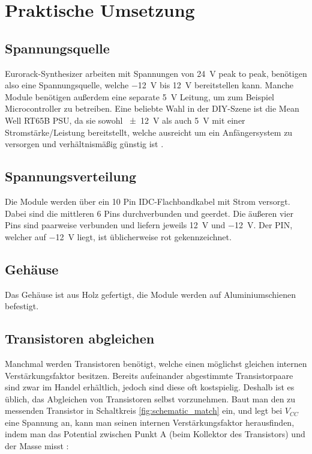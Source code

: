 \chapter{Praktische Umsetzung}

\section{Spannungsquelle}
\label{sec:org2634f8d}
Eurorack-Synthesizer arbeiten mit Spannungen von \SI{24}{\volt} peak to peak, benötigen also eine Spannungsquelle, welche \SI{-12}{\volt} bis \SI{+12}{\volt} bereitstellen kann. Manche Module benötigen außerdem eine separate \SI{5}{\volt} Leitung, um zum Beispiel Microcontroller zu betreiben. Eine beliebte Wahl in der DIY-Szene ist die Mean Well RT65B PSU, da sie sowohl \SI{\pm 12}{\volt} als auch \SI{5}{\volt} mit einer Stromstärke/Leistung bereitstellt, welche ausreicht um ein Anfängersystem zu versorgen und verhältnismäßig günstig ist \cite{modularsynthlab:rt65b}.

\section{Spannungsverteilung}
\label{sec:org805f636}
Die Module werden über ein 10 Pin IDC-Flachbandkabel mit Strom versorgt. Dabei sind die mittleren 6 Pins durchverbunden und geerdet. Die äußeren vier Pins sind paarweise verbunden und liefern jeweils \SI{+12}{\volt} und \SI{-12}{\volt}. Der PIN, welcher auf \SI{-12}{\volt} liegt, ist üblicherweise rot gekennzeichnet.

\section{Gehäuse}
\label{sec:org6cc5c73}
Das Gehäuse ist aus Holz gefertigt, die Module werden auf Aluminiumschienen befestigt.

\section{Transistoren abgleichen \label{Match_Transistors}}
\label{sec:orgfccab31}
Manchmal werden Transistoren benötigt, welche einen möglichst gleichen internen Verstärkungsfaktor besitzen. Bereits aufeinander abgestimmte Transistorpaare sind zwar im Handel erhältlich, jedoch sind diese oft kostspielig. Deshalb ist es üblich, das Abgleichen von Transistoren selbst vorzunehmen. Baut man den zu messenden Transistor in Schaltkreis \ref{fig:schematic_match} ein, und legt bei \(V_{CC}\) eine Spannung an, kann man seinen internen Verstärkungsfaktor herausfinden, indem man das Potential zwischen Punkt A (beim Kollektor des Transistors) und der Masse misst \cite{match_transistors}:

